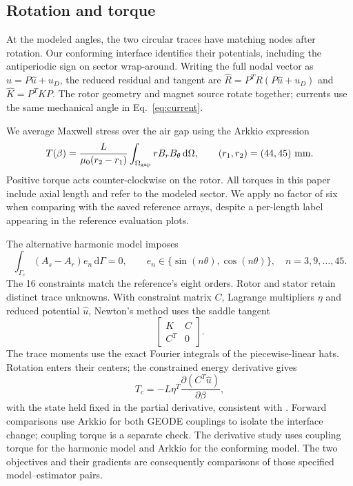 \documentclass{anvil-paper}
\newcommand{\dd}{\,\mathrm{d}}
\begin{document}
\subsection{Rotation and torque}
At the modeled angles, the two circular traces have matching nodes after
rotation. Our conforming interface identifies their potentials, including
the antiperiodic sign on sector wrap-around. Writing the full nodal vector
as $u=P\hat u+u_D$, the reduced residual and tangent are
$\hat R=P^T R(P\hat u+u_D)$ and $\hat K=P^T K P$.
The rotor geometry and magnet source rotate together; currents use the
same mechanical angle in Eq.~\eqref{eq:current}.

We average Maxwell stress over the air gap using the Arkkio expression
\citep{arkkio1987}
\begin{equation}
 T(\beta)=\frac{L}{\mu_0(r_2-r_1)}
  \int_{\Omega_{\rm gap}}r B_r B_\theta\dd\Omega,
 \qquad(r_1,r_2)=(44,45)\ {\rm mm}.
 \label{eq:torque}
\end{equation}
Positive torque acts counter-clockwise on the rotor. All torques in this
paper include axial length and refer to the modeled sector. We apply no
factor of six when comparing with the saved reference arrays, despite a
per-length label appearing in the reference evaluation plots.

The alternative harmonic model imposes
\begin{equation}
 \int_{\Gamma_c}(A_s-A_r)e_n\dd\Gamma=0,\qquad
 e_n\in\{\sin(n\theta),\cos(n\theta)\},\quad n=3,9,\ldots,45.
\end{equation}
The 16 constraints match the reference's eight orders. Rotor and stator
retain distinct trace unknowns. With constraint matrix $C$, Lagrange
multipliers $\eta$ and reduced potential $\hat u$, Newton's method uses
the saddle tangent
\begin{equation}
 \begin{bmatrix}K&C\\ C^T&0\end{bmatrix}.
\end{equation}
The trace moments use the exact Fourier integrals of the piecewise-linear
hats. Rotation enters their centers; the constrained energy derivative gives
\begin{equation}
 T_c=-L\eta^T\frac{\partial(C^T\hat u)}{\partial\beta},
 \label{eq:couplingtorque}
\end{equation}
with the state held fixed in the partial derivative, consistent with
\citet{egger2022torque}. Forward comparisons use Arkkio for both GEODE
couplings to isolate the interface change; coupling torque is a separate
check. The derivative study uses coupling torque for the harmonic model
and Arkkio for the conforming model. The two objectives and their gradients
are consequently comparisons of those specified model--estimator pairs.
\end{document}
